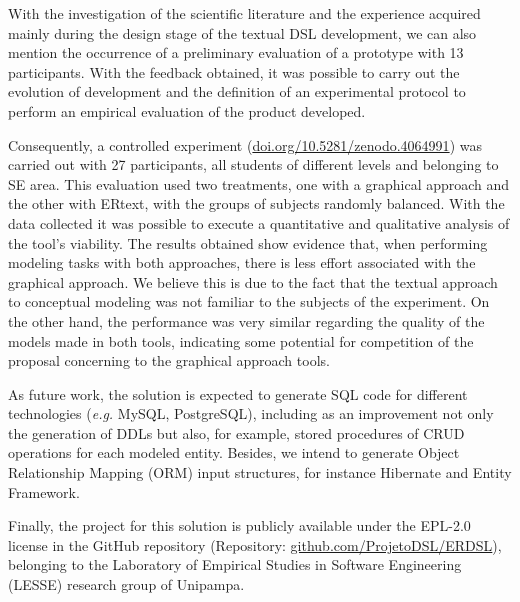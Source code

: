 \documentclass[a4paper,twoside,anonymous]{article}
\begin{document}
With the investigation of the scientific literature and the experience acquired mainly during the design stage of the textual DSL development, we can also mention the occurrence of a preliminary evaluation of a prototype with 13 participants.
With the feedback obtained, it was possible to carry out the evolution of development and the definition of an experimental protocol to perform an empirical evaluation of the product developed.

Consequently, a controlled experiment (\url{doi.org/10.5281/zenodo.4064991}) was carried out with 27 participants, all students of different levels and belonging to SE area.
This evaluation used two treatments, one with a graphical approach and the other with ERtext, with the groups of subjects randomly balanced.
With the data collected it was possible to execute a quantitative and qualitative analysis of the tool's viability.
The results obtained show evidence that, when performing modeling tasks with both approaches, there is less effort associated with the graphical approach.
We believe this is due to the fact that the textual approach to conceptual modeling was not familiar to the subjects of the experiment.
On the other hand, the performance was very similar regarding the quality of the models made in both tools, indicating some potential for competition of the proposal concerning to the graphical approach tools.

As future work, the solution is expected to generate SQL code for different technologies (\textit{e.g.} MySQL, PostgreSQL), including as an improvement not only the generation of DDLs but also, for example, stored procedures of CRUD operations for each modeled entity. 
Besides, we intend to generate Object Relationship Mapping (ORM) input structures, for instance Hibernate and Entity Framework.

Finally, the project for this solution is publicly available under the EPL-2.0 license in the GitHub repository (Repository: \url{github.com/ProjetoDSL/ERDSL}), 
belonging to 
the Laboratory of Empirical Studies in Software Engineering (LESSE) research group of Unipampa.



{\small
}



\end{document}
